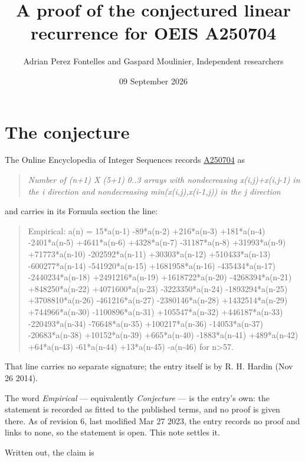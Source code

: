 \documentclass[11pt]{article}
\title{A proof of the conjectured linear recurrence for OEIS A250704}
\author{Adrian Perez Fontelles and Gaspard Moulinier, Independent researchers}
\date{09 September 2026}
\theoremstyle{definition}
\begin{document}
\maketitle
\section{The conjecture}

The Online Encyclopedia of Integer Sequences records \href{https://oeis.org/A250704}{A250704} as

\begin{quote}\itshape Number of (n+1) X (5+1) 0..3 arrays with nondecreasing x(i,j)+x(i,j-1) in the i direction and nondecreasing min(x(i,j),x(i-1,j)) in the j direction\end{quote}

and carries in its Formula section the line:

\begin{quote}\ttfamily Empirical: a(n) = 15*a(n-1) -89*a(n-2) +216*a(n-3) +181*a(n-4) -2401*a(n-5) +4641*a(n-6) +4328*a(n-7) -31187*a(n-8) +31993*a(n-9) +71773*a(n-10) -202592*a(n-11) +30303*a(n-12) +510433*a(n-13) -600277*a(n-14) -541920*a(n-15) +1681958*a(n-16) -435434*a(n-17) -2440234*a(n-18) +2491216*a(n-19) +1618722*a(n-20) -4268394*a(n-21) +848250*a(n-22) +4071600*a(n-23) -3223350*a(n-24) -1893294*a(n-25) +3708810*a(n-26) -461216*a(n-27) -2380146*a(n-28) +1432514*a(n-29) +744966*a(n-30) -1100896*a(n-31) +105547*a(n-32) +446187*a(n-33) -220493*a(n-34) -76648*a(n-35) +100217*a(n-36) -14053*a(n-37) -20683*a(n-38) +10152*a(n-39) +665*a(n-40) -1883*a(n-41) +489*a(n-42) +64*a(n-43) -61*a(n-44) +13*a(n-45) -a(n-46) for n>57.\end{quote}

That line carries no separate signature; the entry itself is by R. H. Hardin (Nov 26 2014).

The word {\itshape Empirical} --- equivalently {\itshape Conjecture} --- is the entry's own: the statement is recorded as fitted to the published terms, and no proof is given there. As of revision 6, last modified Mar 27 2023, the entry records no proof and links to none, so the statement is open. This note settles it.

Written out, the claim is
\end{document}
